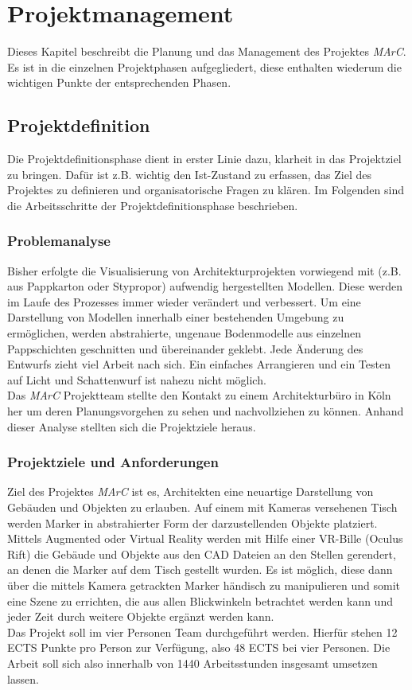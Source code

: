 \section{Projektmanagement} \label{sec:pm}

Dieses Kapitel beschreibt die Planung und das Management des Projektes \textit{MArC}. Es ist in die einzelnen Projektphasen aufgegliedert, diese enthalten wiederum die wichtigen Punkte der entsprechenden Phasen.

\subsection{Projektdefinition}
Die Projektdefinitionsphase dient in erster Linie dazu, klarheit in das Projektziel zu bringen. Dafür ist z.B. wichtig den Ist-Zustand zu erfassen, das Ziel des Projektes zu definieren und organisatorische Fragen zu klären. Im Folgenden sind die Arbeitsschritte der Projektdefinitionsphase beschrieben.
\subsubsection{Problemanalyse}
\label{sec:problemanalyse}
Bisher erfolgte die Visualisierung von Architekturprojekten vorwiegend mit (z.B. aus Pappkarton oder Stypropor) aufwendig hergestellten Modellen. Diese werden im Laufe des Prozesses immer wieder verändert und verbessert.
Um eine Darstellung von Modellen innerhalb einer bestehenden Umgebung zu ermöglichen, werden abstrahierte, ungenaue Bodenmodelle aus einzelnen Pappschichten geschnitten und übereinander geklebt. Jede Änderung des Entwurfs zieht viel Arbeit nach sich. Ein einfaches Arrangieren und ein Testen auf Licht und Schattenwurf ist nahezu nicht möglich.\\
Das \textit{MArC} Projektteam stellte den Kontakt zu einem Architekturbüro in Köln her um deren Planungsvorgehen zu sehen und nachvollziehen zu können. Anhand dieser Analyse stellten sich die Projektziele heraus.


\subsubsection{Projektziele und Anforderungen}
Ziel des Projektes \textit{MArC} ist es, Architekten eine neuartige Darstellung von Gebäuden und Objekten zu erlauben. Auf einem mit Kameras versehenen Tisch werden Marker in abstrahierter Form der darzustellenden Objekte platziert. Mittels Augmented oder Virtual Reality werden mit Hilfe einer VR-Bille (Oculus Rift) die Gebäude und Objekte aus den CAD Dateien an den Stellen gerendert, an denen die Marker auf dem Tisch gestellt wurden.
Es ist möglich, diese dann über die mittels Kamera getrackten Marker händisch zu manipulieren und somit eine Szene zu errichten, die aus allen Blickwinkeln betrachtet werden kann und jeder Zeit durch weitere Objekte ergänzt werden kann. \\
Das Projekt soll im vier Personen Team durchgeführt werden. Hierfür stehen 12 ECTS Punkte pro Person zur Verfügung, also 48 ECTS bei vier Personen. Die Arbeit soll sich also innerhalb von 1440 Arbeitsstunden insgesamt umsetzen lassen.


